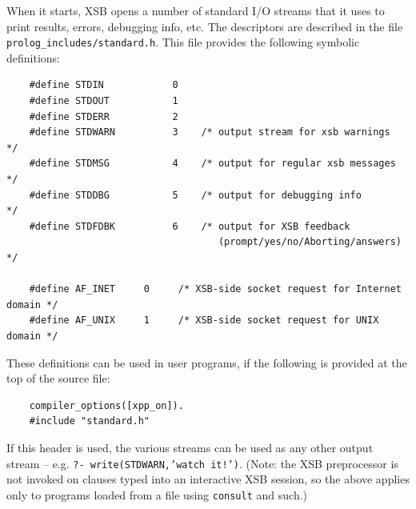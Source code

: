 When it starts, XSB opens a number of standard I/O streams that it
uses to print results, errors, debugging info, etc. The descriptors
are described in the file {\tt prolog\_includes/standard.h}. This file
provides the following symbolic definitions:
\begin{verbatim}
    #define STDIN            0
    #define STDOUT           1
    #define STDERR           2
    #define STDWARN          3    /* output stream for xsb warnings  */
    #define STDMSG           4    /* output for regular xsb messages */
    #define STDDBG           5    /* output for debugging info       */
    #define STDFDBK          6    /* output for XSB feedback
                                     (prompt/yes/no/Aborting/answers) */

    #define AF_INET     0     /* XSB-side socket request for Internet domain */
    #define AF_UNIX     1     /* XSB-side socket request for UNIX domain */
\end{verbatim}
These definitions can be used in user programs, if the following is
provided at the top of the source file:
\begin{verbatim}
    compiler_options([xpp_on]).
    #include "standard.h"
\end{verbatim}
If this header is used, the various streams can be used as any other output stream -- e.g. 
{\tt ?- write(STDWARN,'watch it!')}.
%
(Note: the XSB preprocessor is not invoked on clauses typed into an
interactive XSB session, so the above applies only to programs loaded
from a file using {\tt consult} and such.)

